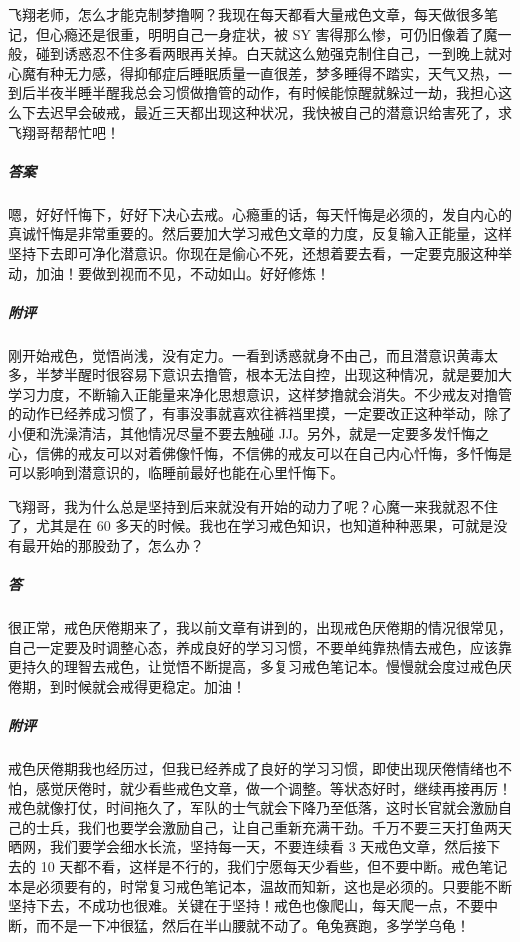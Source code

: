 \begin{case}
    飞翔老师，怎么才能克制梦撸啊？我现在每天都看大量戒色文章，每天做很多笔记，但心瘾还是很重，明明自己一身症状，被 SY 害得那么惨，可仍旧像着了魔一般，碰到诱惑忍不住多看两眼再关掉。白天就这么勉强克制住自己，一到晚上就对心魔有种无力感，得抑郁症后睡眠质量一直很差，梦多睡得不踏实，天气又热，一到后半夜半睡半醒我总会习惯做撸管的动作，有时候能惊醒就躲过一劫，我担心这么下去迟早会破戒，最近三天都出现这种状况，我快被自己的潜意识给害死了，求飞翔哥帮帮忙吧！
    \subparagraph{答案} 嗯，好好忏悔下，好好下决心去戒。心瘾重的话，每天忏悔是必须的，发自内心的真诚忏悔是非常重要的。然后要加大学习戒色文章的力度，反复输入正能量，这样坚持下去即可净化潜意识。你现在是偷心不死，还想着要去看，一定要克服这种举动，加油！要做到视而不见，不动如山。好好修炼！
    \subparagraph{附评} 刚开始戒色，觉悟尚浅，没有定力。一看到诱惑就身不由己，而且潜意识黄毒太多，半梦半醒时很容易下意识去撸管，根本无法自控，出现这种情况，就是要加大学习力度，不断输入正能量来净化思想意识，这样梦撸就会消失。不少戒友对撸管的动作已经养成习惯了，有事没事就喜欢往裤裆里摸，一定要改正这种举动，除了小便和洗澡清洁，其他情况尽量不要去触碰 JJ。另外，就是一定要多发忏悔之心，信佛的戒友可以对着佛像忏悔，不信佛的戒友可以在自己内心忏悔，多忏悔是可以影响到潜意识的，临睡前最好也能在心里忏悔下。
\end{case}

\begin{case}
    飞翔哥，我为什么总是坚持到后来就没有开始的动力了呢？心魔一来我就忍不住了，尤其是在 60 多天的时候。我也在学习戒色知识，也知道种种恶果，可就是没有最开始的那股劲了，怎么办？
    \subparagraph{答} 很正常，戒色厌倦期来了，我以前文章有讲到的，出现戒色厌倦期的情况很常见，自己一定要及时调整心态，养成良好的学习习惯，不要单纯靠热情去戒色，应该靠更持久的理智去戒色，让觉悟不断提高，多复习戒色笔记本。慢慢就会度过戒色厌倦期，到时候就会戒得更稳定。加油！
    \subparagraph{附评} 戒色厌倦期我也经历过，但我已经养成了良好的学习习惯，即使出现厌倦情绪也不怕，感觉厌倦时，就少看些戒色文章，做一个调整。等状态好时，继续再接再厉！戒色就像打仗，时间拖久了，军队的士气就会下降乃至低落，这时长官就会激励自己的士兵，我们也要学会激励自己，让自己重新充满干劲。千万不要三天打鱼两天晒网，我们要学会细水长流，坚持每一天，不要连续看 3 天戒色文章，然后接下去的 10 天都不看，这样是不行的，我们宁愿每天少看些，但不要中断。戒色笔记本是必须要有的，时常复习戒色笔记本，温故而知新，这也是必须的。只要能不断坚持下去，不成功也很难。关键在于坚持！戒色也像爬山，每天爬一点，不要中断，而不是一下冲很猛，然后在半山腰就不动了。龟兔赛跑，多学学乌龟！
\end{case}

